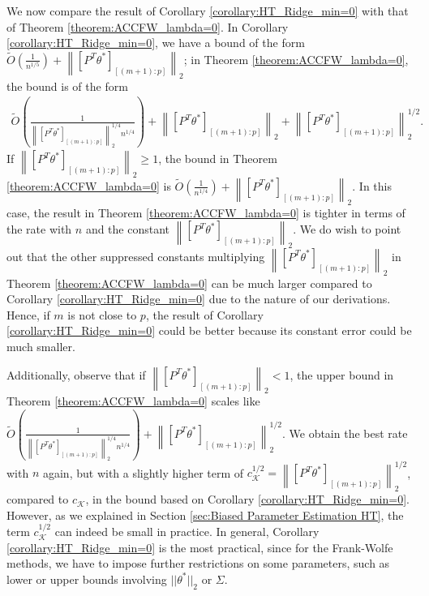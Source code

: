 \documentclass{article}
\begin{document}
We now compare the result of Corollary \ref{corollary:HT_Ridge_min=0} with that of Theorem \ref{theorem:ACCFW_lambda=0}. In Corollary \ref{corollary:HT_Ridge_min=0}, we have a bound of the form $\widetilde{O}\left(\frac{1}{n^{1/5}}\right) + \left\|[P^T\theta^*]_{[(m+1):p]}\right\|_2$; in Theorem \ref{theorem:ACCFW_lambda=0}, the bound is of the form 
\begin{align*}
\widetilde{O}\left(\frac{1}{\left\|[P^T\theta^*]_{[(m+1):p]}\right\|_2^{1/4}n^{1/4}}\right) + \left\|[P^T\theta^*]_{[(m+1):p]}\right\|_2 + \left\|[P^T\theta^*]_{[(m+1):p]}\right\|_2^{1/2}.
\end{align*}
If $\left\|[P^T\theta^*]_{[(m+1):p]}\right\|_2 \geq 1$, the bound in Theorem \ref{theorem:ACCFW_lambda=0} is $\widetilde{O}\left(\frac{1}{n^{1/4}}\right) + \left\|[P^T\theta^*]_{[(m+1):p]}\right\|_2$. In this case, the result in Theorem \ref{theorem:ACCFW_lambda=0} is tighter in terms of the rate with $n$ and the constant $\left\|[P^T\theta^*]_{[(m+1):p]}\right\|_2$. We do wish to point out that the other suppressed constants multiplying $\left\|[P^T\theta^*]_{[(m+1):p]}\right\|_2$ in Theorem \ref{theorem:ACCFW_lambda=0} can be much larger compared to Corollary \ref{corollary:HT_Ridge_min=0} due to the nature of our derivations. Hence, if $m$ is not close to $p$, the result of Corollary \ref{corollary:HT_Ridge_min=0} could be better because its constant error could be much smaller.

Additionally, observe that if $\left\|[P^T\theta^*]_{[(m+1):p]}\right\|_2 < 1$, the upper bound in Theorem \ref{theorem:ACCFW_lambda=0} scales like \\ $\widetilde{O}\left(\frac{1}{\left\|[P^T\theta^*]_{[(m+1):p]}\right\|_2^{1/4}n^{1/4}}\right) + \left\|[P^T\theta^*]_{[(m+1):p]}\right\|_2^{1/2}$. We obtain the best rate with $n$ again, but with a slightly higher term of $c_{\mathcal{K}}^{1/2} = \left\|[P^T\theta^*]_{[(m+1):p]}\right\|_2^{1/2}$, compared to $c_{\mathcal{K}}$, in the bound based on Corollary \ref{corollary:HT_Ridge_min=0}. However, as we explained in Section \ref{sec:Biased Parameter Estimation HT}, the term $c_{\mathcal{K}}^{1/2}$ can indeed be small in practice. In general, Corollary \ref{corollary:HT_Ridge_min=0} is the most practical, since for the Frank-Wolfe methods, we have to impose further restrictions on some parameters, such as lower or upper bounds involving $||\theta^*||_2$ or $\Sigma$.
\end{document}
